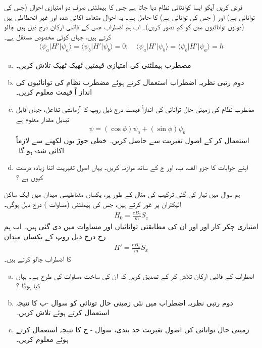 فرض کریں آپکو ایسا کوانٹائی نظام دیا جاتا ہے جس کا ہیملٹنی  صرف دو امتیازی احوال  (جس کی توانائی  ہے) اور  ( جس کی توانائی  ہے) کا حامل ہے۔ یہ احوال متعامد اکائی شدہ اور غیر انحطاطی ہیں (دونوں توانائیوں میں  کو کم تصور کریں)۔ اب ہم اضطراب  جس کے قالبی ارکان درج ذیل ہیں چالو کرتے ہیں، جہاں  کوئی مخصوص مستقل ہے۔
\begin{align}\label{مساوات_تغیریت_قالبی_ارکان_دیے_گئے}
\langle \psi_{a}|H'|\psi_{a}\rangle=\langle \psi_{b}|H'|\psi_{b}\rangle=0; \quad \langle \psi_{a}|H'|\psi_{b}\rangle=\langle \psi_{b}|H'|\psi_{a}\rangle=h
\end{align}
\begin{enumerate}[a.]
\item
 مضطرب ہیملٹنی کی امتیازی قیمتیں   ٹھیک ٹھیک   تلاش کریں۔
\item
دوم رتبی نظریہ اضطراب استعمال کرتے ہوئے مضطرب نظام کی توانائیوں کی انداز اً قیمت معلوم کریں۔
\item
 مضطرب نظام کی زمینی حال توانائی کی اندازاً قیمت درج ذیل روپ کا آزمائشی تفاعل، جہاں  قابل تبدیل مقدار معلوم ہے 
\begin{align}
\psi=(\cos{\phi})\psi_{a}+(\sin{\phi})\psi_{b} 
\end{align}
 استعمال کر کے اصول تغیریت سے حاصل کریں۔  خطی جوڑ یوں لکھنے سے  لازماً اکائی شدہ ہو گا۔
\item
 اپنے جوابات کا جزو الف، ب، اور ج کے ساتھ موازنہ کریں۔ یہاں اصول تغیریت اتنا زیادہ درست کیوں ہے ؟
 \end{enumerate}
ہم سوال  میں تیار کی گئی ترکیب کی مثال کے طور پر، یکساں مقناطیسی میدان  میں ایک ساکن الیکٹران پر غور کرتے ہیں، جس کی ہیملٹنی (مساوات ) درج ذیل ہوگی۔
\begin{align}
H_{0}=\frac{eB_{z}}{m}S_{z} 
\end{align}
 امتیازی چکر کار  اور  اور ان کی مطابقتی توانائیاں  اور  مساوات  میں دی گئی ہیں۔ اب ہم  رخ درج ذیل روپ کے یکساں میدان
\begin{align}
H'=\frac{eB_{x}}{m}S_{x} 
\end{align}
 کا اضطراب چالو کرتے ہیں۔
 \begin{enumerate}[a.]
\item
 اضطراب  کے قالبی ارکان تلاش کر کے تصدیق کریں کہ ان کی ساخت مساوات  کی طرح ہے۔ یہاں  کیا ہوگا ؟
\item
 دوم رتبی نظریہ اضطراب میں نئی زمینی حال تونائی کو سوال -ب کا نتیجہ استعمال کرتے ہوئے تلاش کریں۔
\item
 زمینی حال توانائی کی اصول تغیریت حد بندی، سوال - ج کا نتیجہ استعمال کرتے ہوئے معلوم کریں۔
 \end{enumerate}

